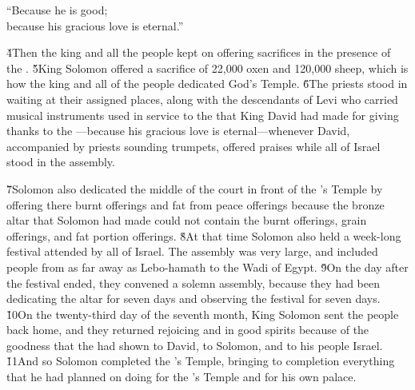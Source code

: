 \begin{poetry}
\poeml ``Because he is good; \\
\poemll    because his gracious love is eternal.''
\end{poetry}

\v{4}Then the king and all the people kept on offering sacrifices in the presence of the . \v{5}King Solomon offered a sacrifice of 22,000 oxen and 120,000 sheep, which is how the king and all of the people dedicated God's Temple. \v{6}The priests stood in waiting at their assigned places, along with the descendants of Levi who carried musical instruments used in service to the  that King David had made for giving thanks to the ---because his gracious love is eternal---whenever David, accompanied by priests sounding trumpets, offered praises while all of Israel stood in the assembly.

\v{7}Solomon also dedicated the middle of the court in front of the 's Temple by offering there burnt offerings and fat from peace offerings because the bronze altar that Solomon had made could not contain the burnt offerings, grain offerings, and fat portion offerings. \v{8}At that time Solomon also held a week-long festival attended by all of Israel. The assembly was very large, and included people from as far away as Lebo-hamath to the Wadi of Egypt. \v{9}On the day after the festival ended, they convened a solemn assembly, because they had been dedicating the altar for seven days and observing the festival for seven days. \v{10}On the twenty-third day of the seventh month, King Solomon sent the people back home, and they returned rejoicing and in good spirits because of the goodness that the  had shown to David, to Solomon, and to his people Israel. \v{11}And so Solomon completed the 's Temple, bringing to completion everything that he had planned on doing for the 's Temple and for his own palace.

